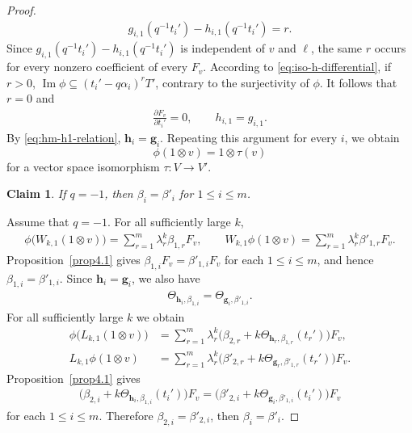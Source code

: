 \documentclass[a4paper]{amsart}
\numberwithin{equation}{section}
\newtheorem{claim}{Claim}
\begin{document}
\begin{proof}
\begin{align*}
g_{i,1}(q^{-1}t_i')-h_{i,1}(q^{-1}t_i')=r.
\end{align*}
Since $g_{i,1}(q^{-1}t_i')-h_{i,1}(q^{-1}t_i')$ is independent of
$v$ and $\ell$, the same $r$ occurs for every nonzero coefficient
of every $F_v$. According to \eqref{eq:iso-h-differential}, if $r>0$,
$\operatorname{Im}\phi\subseteq(t_i'-q\alpha_i)^rT'$, contrary to the surjectivity
of $\phi$. It follows that $r=0$ and
\begin{align*}
\frac{\partial F_v}{\partial t_i'}=0,\qquad h_{i,1}=g_{i,1}.
\end{align*}
By \eqref{eq:hm-h1-relation}, $\mathbf h_i=\mathbf g_i$. Repeating
this argument for every $i$, we obtain
\begin{equation*}
\phi(1\otimes v)=1\otimes\tau(v)
\end{equation*}
for a vector space isomorphism $\tau:V\to V'$.

\begin{claim}
If $q=-1$, then $\beta_i=\beta'_i$ for $1\leq i\leq m$.
\end{claim}
Assume that $q=-1$. For all sufficiently large $k$,
\begin{align*}
\phi\bigl(W_{k,1}(1\otimes v)\bigr)
=\sum_{r=1}^m\lambda_r^k\beta_{1,r}F_v,\qquad
W_{k,1}\phi(1\otimes v)
=\sum_{r=1}^m\lambda_r^k\beta'_{1,r}F_v.
\end{align*}
Proposition~\ref{prop4.1} gives
$\beta_{1,i}F_v=\beta'_{1,i}F_v$ for each $1\leq i\leq m$,
and hence $\beta_{1,i}=\beta'_{1,i}$. Since
$\mathbf h_i=\mathbf g_i$, we also have
\begin{align*}
\Theta_{\mathbf h_i,\beta_{1,i}}
=\Theta_{\mathbf g_i,\beta'_{1,i}}.
\end{align*}
For all sufficiently large $k$ we obtain
\begin{align*}
\phi\bigl(L_{k,1}(1\otimes v)\bigr)
&=\sum_{r=1}^m\lambda_r^k
\bigl(\beta_{2,r}+k\Theta_{\mathbf h_r,\beta_{1,r}}(t_r')\bigr)F_v,\\
L_{k,1}\phi(1\otimes v)
&=\sum_{r=1}^m\lambda_r^k
\bigl(\beta'_{2,r}+k\Theta_{\mathbf g_r,\beta'_{1,r}}(t_r')\bigr)F_v.
\end{align*}
Proposition~\ref{prop4.1} gives
\begin{align*}
\bigl(\beta_{2,i}+k\Theta_{\mathbf h_i,\beta_{1,i}}(t_i')\bigr)F_v
=\bigl(\beta'_{2,i}+k\Theta_{\mathbf g_i,\beta'_{1,i}}(t_i')\bigr)F_v
\end{align*}
for each $1\leq i\leq m$.
Therefore $\beta_{2,i}=\beta'_{2,i}$, then
$\beta_i=\beta'_i$.


\end{proof}
\end{document}
